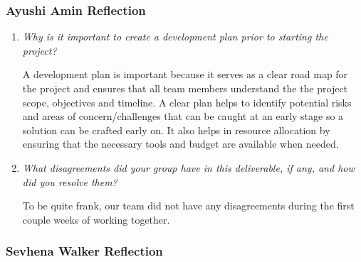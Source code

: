 \documentclass{article}
\begin{document}
\subsubsection*{Ayushi Amin Reflection}

\begin{enumerate}
  \item \textit{Why is it important to create a development plan prior to starting the
    project?}

    A development plan is important because it serves as a clear road map for the project and ensures that all 
    team members understand the the project scope, objectives and timeline. A clear plan helps to identify potential risks
    and areas of concern/challenges that can be caught at an early stage so a solution can be crafted early on. It also helps
    in resource allocation by ensuring that the necessary tools and budget are available when needed.

  \item \textit{What disagreements did your group have in this deliverable, if any, and how did you resolve them?}

    To be quite frank, our team did not have any disagreements during the first couple weeks of working together.

\end{enumerate}

\subsubsection*{Sevhena Walker Reflection}
\end{document}
